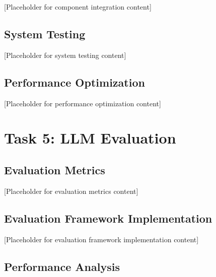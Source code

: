 \documentclass[12pt,a4paper]{article}
\begin{document}
[Placeholder for component integration content]

\subsection{System Testing}


[Placeholder for system testing content]

\subsection{Performance Optimization}


[Placeholder for performance optimization content]

\section{Task 5: LLM Evaluation}


\subsection{Evaluation Metrics}


[Placeholder for evaluation metrics content]

\subsection{Evaluation Framework Implementation}


[Placeholder for evaluation framework implementation content]

\subsection{Performance Analysis}
\end{document}
